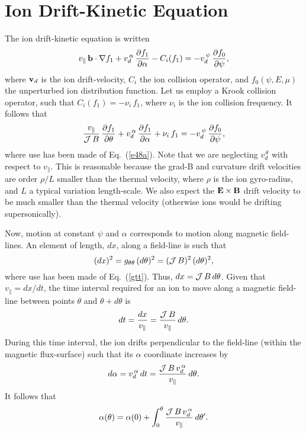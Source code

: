 \documentclass[12pt,prb,aps,notitlepage]{revtex4-1}
\begin{document}
\section{Ion Drift-Kinetic Equation}
 The ion drift-kinetic equation is written
 \begin{equation}
 v_\parallel\,{\bf b}\cdot\nabla f_1 + v_d^{\,\alpha}\,\frac{\partial f_1}{\partial\alpha} - C_i(f_1)=- v_d^{\,\psi}\,\frac{\partial f_0}{\partial\psi},
 \end{equation}
 where ${\bf v}_d$ is the ion drift-velocity, $C_i$ the ion collision operator, and $f_0(\psi,E,\mu)$ the unperturbed ion distribution function. Let us
 employ a Krook collision operator, such that $C_i(f_1)= - \nu_i\,f_1$, where $\nu_i$ is the ion collision frequency. It follows that
 \begin{equation}\label{e71}
 \frac{v_\parallel}{{\cal J}\,B}\,\frac{\partial f_1}{\partial\theta} + v_d^{\,\alpha}\,\frac{\partial f_1}{\partial\alpha} + \nu_i\,f_1= - v_d^{\,\psi}\,\frac{\partial f_0}{\partial\psi},
 \end{equation}
 where use has been made of Eq.~(\ref{e48a}).
 Note that we are neglecting $v_d^{\,\theta}$ with respect to $v_\parallel$. This is reasonable because the grad-B and curvature drift velocities are
 order $\rho/L$ smaller than the thermal velocity, where $\rho$ is the ion gyro-radius, and $L$ a typical variation length-scale. We also
 expect the ${\bf E}\times{\bf B}$ drift velocity to be much smaller than the thermal velocity (otherwise ions would be drifting supersonically). 
 
 Now, motion at constant $\psi$ and $\alpha$ corresponds to motion along magnetic field-lines. An element of length, $dx$, along
 a field-line is such that
 \begin{equation}
 (dx)^2 = g_{\theta\theta}\,(d\theta)^2= ({\cal J}\,B)^2\,(d\theta)^2,
 \end{equation}
 where use has been made of Eq.~(\ref{gtt}). Thus, $dx = {\cal J}\,B\,d\theta$. Given that $v_\parallel = dx/dt$, the time interval required for an ion to move along a
 magnetic field-line between points  $\theta$ and $\theta+d\theta$ is
 \begin{equation}\label{dt}
 dt = \frac{dx}{v_\parallel} =\frac{{\cal J}\,B}{v_\parallel}\,d\theta.
 \end{equation}
 During this time interval, the ion drifts perpendicular to the field-line (within the magnetic flux-surface) such that its $\alpha$ coordinate
 increases by
 \begin{equation}
 d\alpha =v_d^{\,\alpha}\,dt =\frac{{\cal J}\,B\,v_d^{\,\alpha}}{v_\parallel}\,d\theta.
 \end{equation}
 It follows that
 \begin{equation}
 \alpha(\theta)= \alpha(0) + \int_0^\theta\frac{{\cal J}\,B\,v_d^{\,\alpha}}{v_\parallel}\,d\theta'.
 \end{equation}
 
\end{document}
